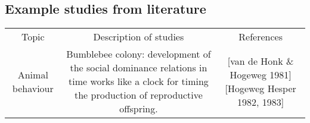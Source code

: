 \subsection{Example studies from literature}

\begin{table} 
    \begin{tabular}{ c c c }
        Topic & Description of studies & References \\ 
Animal behaviour & Bumblebee colony: development of the social dominance relations in time works like a clock for timing the production of reproductive offspring. & [van de Honk \& Hogeweg 1981] [Hogeweg \C Hesper 1982, 1983] \\
    \end{tabular} 
\end{table}